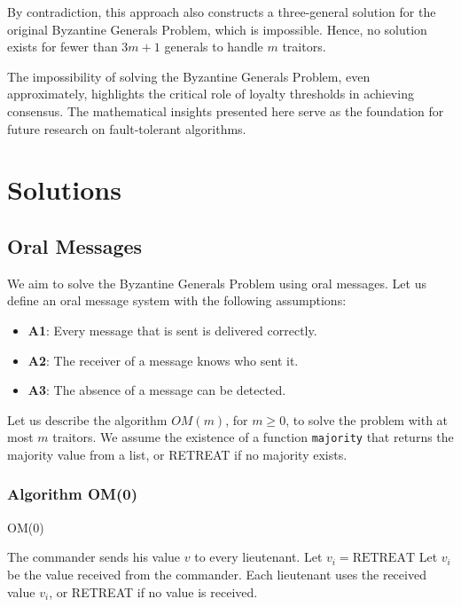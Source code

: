 \documentclass[12pt]{article}
\theoremstyle{remark}
\begin{document}
By contradiction, this approach also constructs a three-general solution for the original Byzantine Generals Problem, which is impossible. Hence, no solution exists for fewer than $3m + 1$ generals to handle $m$ traitors.

The impossibility of solving the Byzantine Generals Problem, even approximately, highlights the critical role of loyalty thresholds in achieving consensus. The mathematical insights presented here serve as the foundation for future research on fault-tolerant algorithms.



\section*{\centering Solutions}
\subsection*{\textbf{Oral Messages}}

We aim to solve the Byzantine Generals Problem using oral messages. Let us define an oral message system with the following assumptions:
\begin{itemize}
    \item \textbf{A1}: Every message that is sent is delivered correctly.
    \item \textbf{A2}: The receiver of a message knows who sent it.
    \item \textbf{A3}: The absence of a message can be detected.
\end{itemize}

Let us describe the algorithm \( OM(m) \), for \( m \geq 0 \), to solve the problem with at most \( m \) traitors. We assume the existence of a function \texttt{majority} that returns the majority value from a list, or RETREAT if no majority exists.


\subsubsection*{Algorithm OM(0)}
\begin{algorithm}
\caption{OM(0)}
\begin{algorithmic}[1]
\State The commander sends his value \( v \) to every lieutenant.
        \State Let \( v_i = \text{RETREAT} \)
    \Else
        \State Let \( v_i \) be the value received from the commander.
    \EndIf
\EndFor
\State Each lieutenant uses the received value \( v_i \), or RETREAT if no value is received.
\end{algorithmic}
\end{algorithm}
\end{document}

